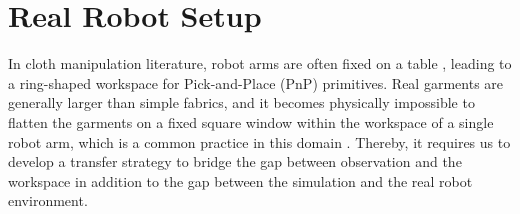 \documentclass[journal]{IEEEtran}
\begin{document}
\section{Real Robot Setup} \label{sec:real-world-setup}

In cloth manipulation literature, robot arms are often fixed on a table  \cite{lin2022learning,lee2024learning,canberk2023cloth}, leading to a ring-shaped workspace for Pick-and-Place (PnP) primitives. Real garments are generally larger than simple fabrics, and it becomes physically impossible to flatten the garments on a fixed square window within the workspace of a single robot arm, which is a common practice in this domain \cite{kadi2025draper, hoque2022visuospatial, lee2021learning}. Thereby, it requires us to develop a transfer strategy to bridge the gap between observation and the workspace in addition to the gap between the simulation and the real robot environment.
\end{document}
